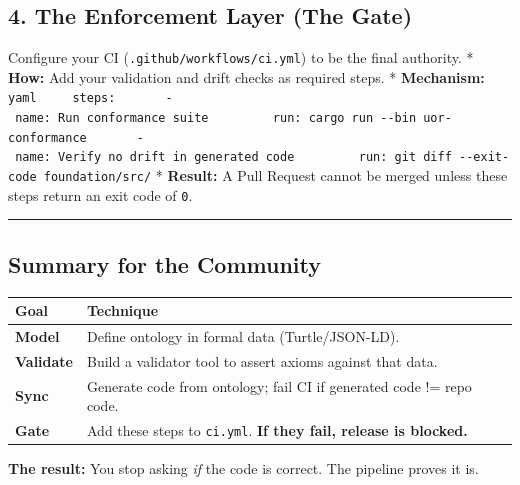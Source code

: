 \documentclass[12pt,a4paper]{article}
\begin{document}
\subsection{4. The Enforcement Layer (The
Gate)}\label{the-enforcement-layer-the-gate}

Configure your CI (\texttt{.github/workflows/ci.yml}) to be the final
authority. * \textbf{How:} Add your validation and drift checks as
required steps. * \textbf{Mechanism:}
\texttt{yaml\ \ \ \ \ steps:\ \ \ \ \ \ \ -\ name:\ Run\ conformance\ suite\ \ \ \ \ \ \ \ \ run:\ cargo\ run\ -\/-bin\ uor-conformance\ \ \ \ \ \ \ -\ name:\ Verify\ no\ drift\ in\ generated\ code\ \ \ \ \ \ \ \ \ run:\ git\ diff\ -\/-exit-code\ foundation/src/}
* \textbf{Result:} A Pull Request cannot be merged unless these steps
return an exit code of \texttt{0}.

\begin{center}\rule{0.5\linewidth}{0.5pt}\end{center}

\subsection{Summary for the Community}\label{summary-for-the-community}

{\def\LTcaptype{none} %
\begin{longtable}[]{@{}
  >{\raggedright\arraybackslash}p{}
  >{\raggedright\arraybackslash}p{}@{}}
\toprule\noalign{}
\begin{minipage}[b]{\linewidth}\raggedright
Goal
\end{minipage} & \begin{minipage}[b]{\linewidth}\raggedright
Technique
\end{minipage} \\
\midrule\noalign{}
\endhead
\bottomrule\noalign{}
\endlastfoot
\textbf{Model} & Define ontology in formal data (Turtle/JSON-LD). \\
\textbf{Validate} & Build a validator tool to assert axioms against that
data. \\
\textbf{Sync} & Generate code from ontology; fail CI if generated code
!= repo code. \\
\textbf{Gate} & Add these steps to \texttt{ci.yml}. \textbf{If they
fail, release is blocked.} \\
\end{longtable}
}

\textbf{The result:} You stop asking \emph{if} the code is correct. The
pipeline proves it is.
\end{document}

